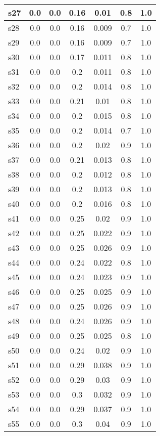 \documentclass{article}
\begin{document}
\begin{tabular}{|l|c|c|c|c|c|c|}
\hline
s27 &0.0 & 0.0 & 0.16 & 0.01 & 0.8 & 1.0\\
\hline
s28 &0.0 & 0.0 & 0.16 & 0.009 & 0.7 & 1.0\\
\hline
s29 &0.0 & 0.0 & 0.16 & 0.009 & 0.7 & 1.0\\
\hline
s30 &0.0 & 0.0 & 0.17 & 0.011 & 0.8 & 1.0\\
\hline
s31 &0.0 & 0.0 & 0.2 & 0.011 & 0.8 & 1.0\\
\hline
s32 &0.0 & 0.0 & 0.2 & 0.014 & 0.8 & 1.0\\
\hline
s33 &0.0 & 0.0 & 0.21 & 0.01 & 0.8 & 1.0\\
\hline
s34 &0.0 & 0.0 & 0.2 & 0.015 & 0.8 & 1.0\\
\hline
s35 &0.0 & 0.0 & 0.2 & 0.014 & 0.7 & 1.0\\
\hline
s36 &0.0 & 0.0 & 0.2 & 0.02 & 0.9 & 1.0\\
\hline
s37 &0.0 & 0.0 & 0.21 & 0.013 & 0.8 & 1.0\\
\hline
s38 &0.0 & 0.0 & 0.2 & 0.012 & 0.8 & 1.0\\
\hline
s39 &0.0 & 0.0 & 0.2 & 0.013 & 0.8 & 1.0\\
\hline
s40 &0.0 & 0.0 & 0.2 & 0.016 & 0.8 & 1.0\\
\hline
s41 &0.0 & 0.0 & 0.25 & 0.02 & 0.9 & 1.0\\
\hline
s42 &0.0 & 0.0 & 0.25 & 0.022 & 0.9 & 1.0\\
\hline
s43 &0.0 & 0.0 & 0.25 & 0.026 & 0.9 & 1.0\\
\hline
s44 &0.0 & 0.0 & 0.24 & 0.022 & 0.8 & 1.0\\
\hline
s45 &0.0 & 0.0 & 0.24 & 0.023 & 0.9 & 1.0\\
\hline
s46 &0.0 & 0.0 & 0.25 & 0.025 & 0.9 & 1.0\\
\hline
s47 &0.0 & 0.0 & 0.25 & 0.026 & 0.9 & 1.0\\
\hline
s48 &0.0 & 0.0 & 0.24 & 0.026 & 0.9 & 1.0\\
\hline
s49 &0.0 & 0.0 & 0.25 & 0.025 & 0.8 & 1.0\\
\hline
s50 &0.0 & 0.0 & 0.24 & 0.02 & 0.9 & 1.0\\
\hline
s51 &0.0 & 0.0 & 0.29 & 0.038 & 0.9 & 1.0\\
\hline
s52 &0.0 & 0.0 & 0.29 & 0.03 & 0.9 & 1.0\\
\hline
s53 &0.0 & 0.0 & 0.3 & 0.032 & 0.9 & 1.0\\
\hline
s54 &0.0 & 0.0 & 0.29 & 0.037 & 0.9 & 1.0\\
\hline
s55 &0.0 & 0.0 & 0.3 & 0.04 & 0.9 & 1.0\\

\end{tabular}
\end{document}
